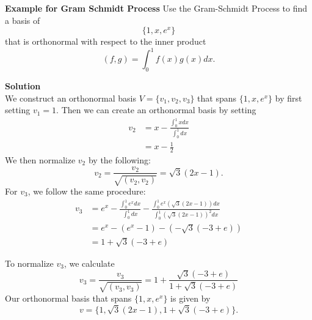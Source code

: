 \textbf{Example for Gram Schmidt Process} Use the Gram-Schmidt Process to find a basis of $$\{1, x, e^x\}$$ that is orthonormal with respect to the inner product $$(f, g) = \int_{0}^1 f(x) g(x) dx.$$

\textbf{Solution}\\

We construct an orthonormal basis $V = \{v_1, v_2, v_3\}$ that spans $\{1, x, e^x\}$ by first setting $v_1 = 1$. Then we can create an orthonormal basis by setting
\begin{align*}
v_2 &= x - \frac{\int_0^1 x dx}{\int_0^1 dx}\\
&= x - \frac{1}{2}
\end{align*}
We then normalize $v_2$ by the following:
$$v_2 = \frac{v_2}{\sqrt{(v_2, v_2)}} = \sqrt{3}(2x - 1).$$
For $v_3$, we follow the same procedure: 
\begin{align*}
v_3 &= e^x - \frac{\int_0^1 e^x dx}{\int_0^1 dx} - \frac{\int_0^1 e^x (\sqrt{3}(2x - 1)) dx}{\int_0^1 (\sqrt{3}(2x - 1))^2 dx}\\
&= e^x - (e^x - 1) - (-\sqrt{3}(-3 + e)) \\
&= 1 + \sqrt{3}(-3 + e)
\end{align*}

To normalize $v_3$, we calculate $$v_3 = \frac{v_3}{\sqrt{(v_3, v_3)}} = 1 + \frac{\sqrt{3}(-3 + e)}{1 + \sqrt{3}(-3 + e)}$$
Our orthonormal basis that spans $\{1, x, e^x\}$ is given by $$v = \{1, \sqrt{3}(2x - 1), 1 + \sqrt{3}(-3 + e)\}.$$